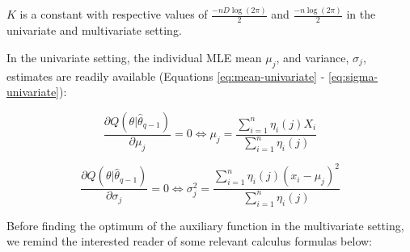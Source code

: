 \(K\) is a constant with respective values of \(\frac{-nD\log(2\pi)}{2}\) and \(\frac{-n\log(2\pi)}{2}\) in the univariate and multivariate setting.

In the univariate setting, the individual MLE mean \(\mu_j\), and variance, \(\sigma_j\), estimates are readily available (Equations \eqref{eq:mean-univariate} - \eqref{eq:sigma-univariate}):

\begin{equation}
 \frac{\partial Q(\theta|\hat{\theta}_{q-1})}{\partial \mu_j} = 0
 \Leftrightarrow
  \mu_j = \frac{\sum_{i=1}^n \eta_i(j) X_i}{\sum_{i=1}^n \eta_i(j)}
\label{eq:mean-univariate}
\end{equation}

\begin{equation}
 \frac{\partial Q(\theta|\hat{\theta}_{q-1})}{\partial \sigma_j} = 0
 \Leftrightarrow
\sigma_j^2  =  \frac{\sum_{i=1}^n \eta_i(j) (x_i - \mu_j)^2 }{\sum_{i=1}^n \eta_i(j)}
\label{eq:sigma-univariate}
\end{equation}

Before finding the optimum of the auxiliary function in the multivariate setting, we remind the interested reader of some relevant calculus formulas below:

